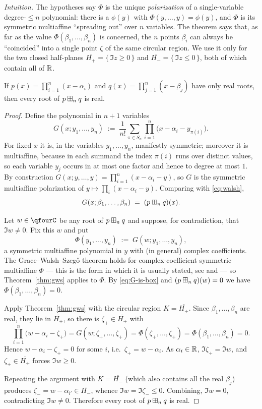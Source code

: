 \noindent\emph{Intuition.} The hypotheses say $\Phi$ is the unique
\emph{polarization} of a single-variable degree-$\le n$ polynomial: there is a
$\phi(y)$ with $\Phi(y,\dots,y)=\phi(y)$, and $\Phi$ is its symmetric
multiaffine ``spreading out'' over $n$ variables. The theorem says that, as far
as the value $\Phi(\beta_1,\dots,\beta_n)$ is concerned, the $n$ points
$\beta_i$ can always be ``coincided'' into a single point $\zeta$ of the same
circular region. We use it only for the two closed half-planes
$\overline{H_+}=\{\,\Im z\ge0\,\}$ and $\overline{H_-}=\{\,\Im z\le0\,\}$, both of
which contain all of $\mathbb{R}$.

\begin{qfourlemma}\label{lem:walsh}
If $p(x)=\prod_{i=1}^n(x-\alpha_i)$ and $q(x)=\prod_{j=1}^n(x-\beta_j)$ have only
real roots, then every root of $p\boxplus_n q$ is real.
\end{qfourlemma}

\begin{proof}
Define the polynomial in $n+1$ variables
\[
G(x;y_1,\dots,y_n)\;:=\;\frac{1}{n!}\sum_{\pi\in S_n}\prod_{i=1}^n\bigl(x-\alpha_i-y_{\pi(i)}\bigr).
\]
For fixed $x$ it is, in the variables $y_1,\dots,y_n$, manifestly symmetric;
moreover it is multiaffine, because in each summand the index $\pi(i)$ runs over
distinct values, so each variable $y_j$ occurs in at most one factor and hence to
degree at most $1$. By construction $G(x;y,\dots,y)=\prod_{i=1}^n(x-\alpha_i-y)$,
so $G$ is the symmetric multiaffine polarization of
$y\mapsto\prod_i(x-\alpha_i-y)$. Comparing with \eqref{eq:walsh},
\begin{equation}\label{eq:G-is-box}
G(x;\beta_1,\dots,\beta_n)\;=\;(p\boxplus_n q)(x).
\end{equation}

Let $w\in\qfourC$ be any root of $p\boxplus_n q$ and suppose, for contradiction,
that $\Im w\ne0$. Fix this $w$ and put
\[
\Phi(y_1,\dots,y_n)\;:=\;G(w;y_1,\dots,y_n),
\]
a symmetric multiaffine polynomial in $y$ with (in general) complex
coefficients. The Grace--Walsh--Szeg\H{o} theorem holds for complex-coefficient
symmetric multiaffine $\Phi$ --- this is the form in which it is usually stated,
see \cite[Thm.~3.4.1b]{RS} and \cite{MSS22} --- so Theorem~\ref{thm:gws}
applies to $\Phi$. By \eqref{eq:G-is-box} and
$(p\boxplus_n q)(w)=0$ we have $\Phi(\beta_1,\dots,\beta_n)=0$.

Apply Theorem~\ref{thm:gws} with the circular region $K=\overline{H_+}$. Since
$\beta_1,\dots,\beta_n$ are real, they lie in $\overline{H_+}$, so there is
$\zeta_+\in\overline{H_+}$ with
\[
\prod_{i=1}^n\bigl(w-\alpha_i-\zeta_+\bigr)=G(w;\zeta_+,\dots,\zeta_+)
=\Phi(\zeta_+,\dots,\zeta_+)=\Phi(\beta_1,\dots,\beta_n)=0 .
\]
Hence $w-\alpha_i-\zeta_+=0$ for some $i$, i.e.\ $\zeta_+=w-\alpha_i$. As
$\alpha_i\in\mathbb{R}$, $\Im\zeta_+=\Im w$, and $\zeta_+\in\overline{H_+}$ forces
$\Im w\ge0$.

Repeating the argument with $K=\overline{H_-}$ (which also contains all the real
$\beta_j$) produces $\zeta_-=w-\alpha_{i'}\in\overline{H_-}$, whence
$\Im w=\Im\zeta_-\le0$. Combining, $\Im w=0$, contradicting $\Im w\ne0$.
Therefore every root of $p\boxplus_n q$ is real.
\end{proof}

